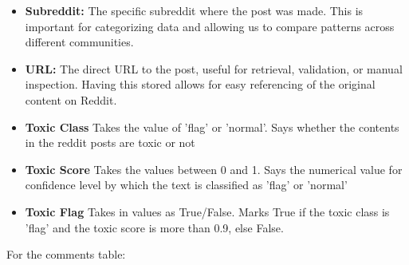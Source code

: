 \documentclass[sigconf]{acmart}
\begin{document}
\begin{itemize}
        \item \textbf{Subreddit:} The specific subreddit where the post was made. This is important for categorizing data and allowing us to compare patterns across different communities.
        
        \item \textbf{URL:} The direct URL to the post, useful for retrieval, validation, or manual inspection. Having this stored allows for easy referencing of the original content on Reddit.

        \item \textbf{Toxic Class} Takes the value of 'flag' or 'normal'. Says whether the contents in the reddit posts are toxic or not

        \item \textbf{Toxic Score} Takes the values between 0 and 1. Says the numerical value for confidence level by which the text is classified as 'flag' or 'normal'

        \item \textbf{Toxic Flag} Takes in values as True/False. Marks True if the toxic class is 'flag' and the toxic score is more than 0.9, else False.

    
    \end{itemize}

For the comments table:
\end{document}
